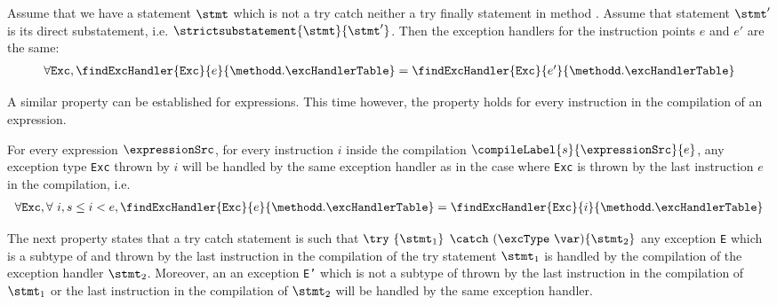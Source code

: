 \begin{compProp}\label{compile:prop:compProp8}
 Assume that we have a statement  $\stmt$  which is not a try catch  neither a try finally statement in method \methodd. Assume that 
  statement $\stmt'$ is its direct substatement, i.e. 
$\strictsubstatement{\stmt}{\stmt'} $. 
Then the exception handlers for the instruction points $e$ and $e'$ are the same:
$$ \begin{array}{l}
          \forall \mbox{\rm\tt{Exc}}, \findExcHandler{\mbox{\rm\tt{Exc}} }{e}{\methodd.\excHandlerTable} = 
	 \findExcHandler{\mbox{\rm\tt{Exc}} }{e'}{\methodd.\excHandlerTable} 
   \end{array}
$$


\end{compProp}

A similar property can be established for expressions. This time however, the property holds for
every instruction in the compilation of an expression.
 
\begin{compProp}\label{compile:prop:compProp9}
  For every expression $\expressionSrc$,
  for every instruction $i$ inside the compilation  $\compileLabel{s}{\expressionSrc}{e}$,
  any exception type \mbox{\rm\tt{Exc}} thrown by  $i$  will be handled by the same exception handler 
  as in the case where \mbox{\rm\tt{Exc}}   is thrown by the last instruction $e$ in the compilation, i.e.
$$ \begin{array}{l}
          \forall \mbox{\rm\tt{Exc}}, \forall  \ i, s \le i < e , 
	   \findExcHandler{\mbox{\rm\tt{Exc}} }{e}{\methodd.\excHandlerTable} = 
	  \findExcHandler{\mbox{\rm\tt{Exc}} }{i}{\methodd.\excHandlerTable} 
   \end{array}
$$
\end{compProp}

The next property states that a try catch statement is such that $ \try \ \{ \stmt_1 \} $ $ \catch \ (\excType \ \var )\{ \stmt_2 \}  $ 
any exception \texttt{E} which is a subtype of \excType{} and thrown by  the last instruction in the compilation of the try statement $ \stmt_1 $ is handled by the 
compilation of the exception handler $\stmt_2$. Moreover, an 
 an exception \texttt{E'} which is not a subtype of \excType{} thrown by the  last instruction in the compilation of $\stmt_1$
or the last instruction  in the compilation of $\stmt_2$ will be handled by the same exception handler. 

